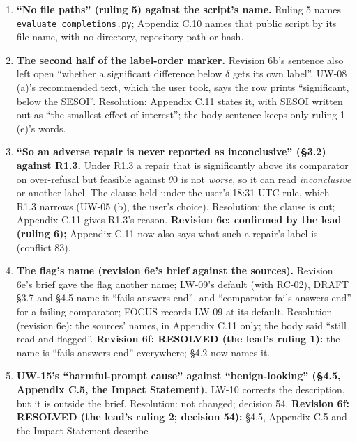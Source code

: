 \documentclass{article}
\theoremstyle{plain}
\theoremstyle{definition}
\theoremstyle{remark}
\begin{document}
\begin{enumerate}
        body says ``pre-registered sensitivity analyses''.
  \item \textbf{``No file paths'' (ruling 5) against the script's name.} Ruling
        5 names \nolinkurl{evaluate_completions.py}; Appendix C.10 names that
        public script by its file name, with no directory, repository path or
        hash.
  \item \textbf{The second half of the label-order marker.} Revision 6b's
        sentence also left open ``whether a significant difference below
        $\delta$ gets its own label''. UW-08 (a)'s recommended text, which the
        user took, says the row prints ``significant, below the SESOI''.
        Resolution: Appendix C.11 states it, with SESOI written out as ``the
        smallest effect of interest''; the body sentence keeps only ruling 1
        (e)'s words.
  \item \textbf{``So an adverse repair is never reported as inconclusive''
        (\S{}3.2) against R1.3.} Under R1.3 a repair that is significantly above
        its comparator on over-refusal but feasible against $\theta$0 is not
        \emph{worse}, so it can read \emph{inconclusive} or another label. The
        clause held under the user's 18:31 UTC rule, which R1.3 narrows (UW-05
        (b), the user's choice). Resolution: the clause is cut; Appendix C.11
        gives R1.3's reason. \textbf{Revision 6e: confirmed by the lead (ruling
        6);} Appendix C.11 now also says what such a repair's label is (conflict
        83).
  \item \textbf{The flag's name (revision 6e's brief against the sources).}
        Revision 6e's brief gave the flag another name; LW-09's default (with
        RC-02), DRAFT \S{}3.7 and \S{}4.5 name it ``fails answers end'', and
        ``comparator fails answers end'' for a failing comparator; FOCUS records
        LW-09 at its default. Resolution (revision 6e): the sources' names, in
        Appendix C.11 only; the body said ``still read and flagged''.
        \textbf{Revision 6f: RESOLVED (the lead's ruling 1):} the name is
        ``fails answers end'' everywhere; \S{}4.2 now names it.
  \item \textbf{UW-15's ``harmful-prompt cause'' against ``benign-looking''
        (\S{}4.5, Appendix C.5, the Impact Statement).} LW-10 corrects the
        description, but it is outside the brief. Resolution: not changed;
        decision 54. \textbf{Revision 6f: RESOLVED (the lead's ruling 2;
        decision 54):} \S{}4.5, Appendix C.5 and the Impact Statement describe

\end{enumerate}
\end{document}
